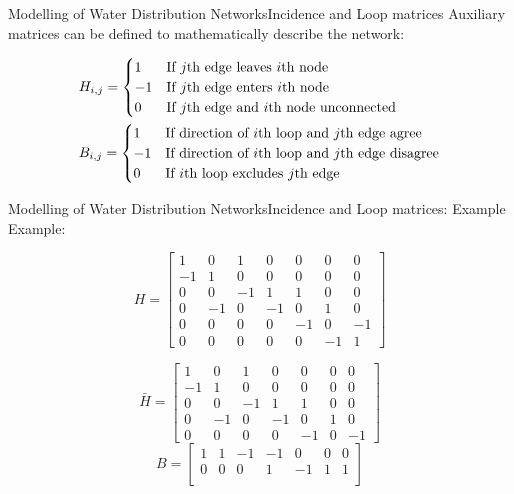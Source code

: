 \begin{frame}{Modelling of Water Distribution Networks}{Incidence and Loop matrices}
Auxiliary matrices can be defined to mathematically describe the network:


\begin{equation*}
	\begin{aligned}
		&H_{i,j} = \begin{cases}
			1 & \text{If $j$th edge leaves $i$th node}\\
			-1 & \text{If $j$th edge enters $i$th node} \\
			0 & \text{If $j$th edge and $i$th node unconnected} 
		\end{cases} \\
		&B_{i,j} = \begin{cases}
			1 & \text{If direction of $ i $th loop and} \text{ $j$th edge agree}\\
			-1 & \text{If direction of $ i $th loop and} \text{ $j$th edge disagree}\\
			0 & \text{If $ i $th loop excludes $ j $th edge}\\
		\end{cases}
	\end{aligned}
\end{equation*}

\end{frame}


\begin{frame}{Modelling of Water Distribution Networks}{Incidence and Loop matrices: Example}
Example:

\begin{equation}
	H = \begin{bmatrix}
		1 & 0 & 1 & 0 & 0 & 0 & 0\\
		-1 & 1 & 0 & 0 & 0 & 0 & 0\\
		0 & 0 & -1 & 1 & 1 & 0 & 0\\
		0 & -1 & 0 & -1 & 0 & 1 & 0\\
		0 & 0 & 0 & 0 & -1 &  0  & -1\\
		0 & 0 & 0 & 0 & 0 & -1 & 1
	\end{bmatrix}
	\label{eq:H_simplified}
\end{equation} 

\begin{equation}
	\bar{H} = \begin{bmatrix}
		1 & 0 & 1 & 0 & 0 & 0 & 0\\
		-1 & 1 & 0 & 0 & 0 & 0 & 0\\
		0 & 0 & -1 & 1 & 1 & 0 & 0\\
		0 & -1 & 0 & -1 & 0 & 1 & 0\\
		0 & 0 & 0 & 0 & -1 &  0  & -1
	\end{bmatrix}
\end{equation}
\begin{equation}
	B = \begin{bmatrix}
		1 & 1 & -1 & -1 & 0 & 0 & 0\\
		0 & 0 & 0 & 1 & -1 & 1 & 1\\
	\end{bmatrix}
\end{equation}
\end{frame}


